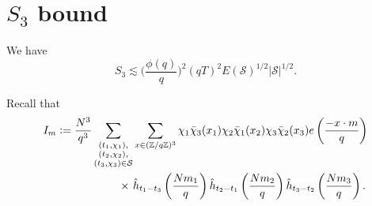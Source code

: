 \section{$S_3$ bound}\label{s_3chapter}
\begin{proposition}\label{s_3bound}
    We have \[
    S_3 \lesssim \Big(\frac{\phi(q)}{q}\Big)^2 (qT)^2 E(\mathcal{S})^{1/2} |\mathcal{S}|^{1/2}.
    \]
\end{proposition}
Recall that \begin{align*}
	I_m\defeq\frac{N^3}{q^3}\sum_{\substack{(t_1,\chi_1),\\(t_2,\chi_2),\\(t_3,\chi_3)\in\mathcal{S}}} &\sum_{x\in (\mathbb{Z}/q\mathbb{Z})^3}\chi_1\bar{\chi}_3(x_1)\chi_2\bar{\chi}_1(x_2)\chi_3\bar{\chi}_2(x_3) e\left(\frac{-x\cdot m}{q}\right)\\
	\times \ &\hat{h}_{t_1-t_3}\left(\frac{Nm_1}{q}\right)\hat{h}_{t_2-t_1}\left(\frac{Nm_2}{q}\right)\hat{h}_{t_3-t_2}\left(\frac{Nm_3}{q}\right).
\end{align*}


